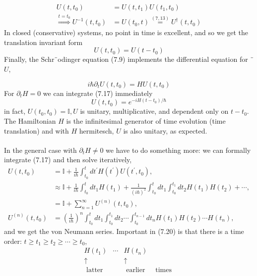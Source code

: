 \begin{align} U\left(t, t_{0}\right) &=U\left(t, t_{1}\right) U\left(t_{1}, t_{0}\right) \\ \stackrel{t=t_{0}}{\Rightarrow} U^{-1}\left(t, t_{0}\right) &=U\left(t_{0}, t\right) \stackrel{(7,13)}{=} U^{\dagger}\left(t, t_{0}\right) 
\end{align}
In closed (conservative) systems, no point in time is excellent, and so we get the translation invariant form
\begin{equation}
    U\left(t, t_{0}\right)=U\left(t-t_{0}\right)
    \end{equation}
Finally, the Schr¨odinger equation (7.9) implements the differential equation for ¨$U$,

%
\begin{equation}
    i \hbar \partial_{t} U\left(t, t_{0}\right)=H U\left(t, t_{0}\right)
    \end{equation}
For $\partial_t H = 0$ we can integrate (7.17) immediately
\begin{equation}
    U\left(t, t_{0}\right)=e^{-i H\left(t-t_{0}\right) / \hbar}
    \end{equation}
in fact, $U (t_0, t_0) = \mathbb{I}, U$ is unitary, multiplicative, and dependent only on $t - t_0$. The Hamiltonian $H$ is the infinitesimal generator of time evolution (time translation) and with $H$ hermitesch, $U$ is also unitary, as expected.\\\\
In the general case with $\partial_t H\neq 0$ we have to do something more: we can formally integrate (7.17) and then solve iteratively,
\begin{align}
    U\left(t, t_{0}\right)&=\mathbb{I}+\frac{1}{i \hbar} \int_{t_{0}}^{t} d t^{\prime} H\left(t^{\prime}\right) U\left(t^{\prime}, t_{0}\right),\\
    &\approx \mathbb{I}+ \frac{1}{i\hbar}\int_{t_0}^t dt_1H(t_1)+\frac{1}{(i\hbar)^2}\int_{t_0}^t dt_1\int_{t_0}^{t_1}dt_2H(t_1)H(t_2)+\cdots,\nonumber\\
    &=\mathbb{I}+\sum_{n=1}^{\infty}U^{(n)}(t,t_0),\\
    U^{(n)}(t,t_0)&=\left(\frac{1}{i\hbar}\right)^n\int_{t_0}^t dt_1\int_{t_0}^{t_1}dt_2\cdots\int_{t_0}^{t_{n-1}}dt_nH(t_1)H(t_2)\cdots H(t_n),\nonumber
\end{align}
and we get the von Neumann series. Important in (7.20) is that there is a time order: $t\geq t_1\geq t_2\geq\cdots\geq t_0$,
\begin{equation}
\begin{array}{cccc}
    {H\left(t_{1}\right)} & {\cdots} & {H\left(t_{n}\right)} & \\ 
    {\uparrow} & {} & {\uparrow} & \\ 
    {\text { latter }} & {} & {\text { earlier }} & {\text { times }}
\end{array}
\end{equation}
